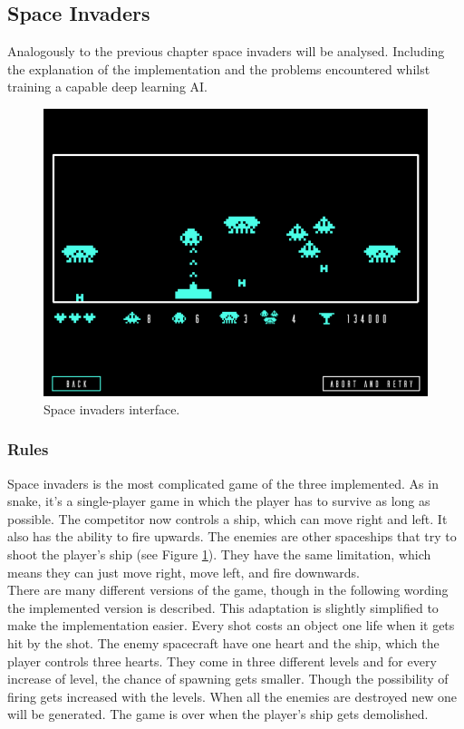 \documentclass[12pt]{article}
\begin{document}
\subsection{Space Invaders}
Analogously to the previous chapter space invaders will be analysed. Including the explanation of the implementation and the problems encountered whilst training a capable deep learning AI.
\begin{figure}[ht]
    \centering
    \includegraphics[width=0.9\linewidth]{pictures/SpaceInvaders.png}
    \caption{Space invaders interface.}
    \label{fig:spaceinvaders}
\end{figure}
\subsubsection{Rules}
Space invaders is the most complicated game of the three implemented. As in snake, it's a single-player game in which the player has to survive as long as possible. The competitor now controls a ship, which can move right and left. It also has the ability to fire upwards. The enemies are other spaceships that try to shoot the player's ship (see Figure \ref{fig:spaceinvaders}). They have the same limitation, which means they can just move right, move left, and fire downwards. \\
There are many different versions of the game, though in the following wording the implemented version is described. This adaptation is slightly simplified to make the implementation easier. Every shot costs an object one life when it gets hit by the shot. The enemy spacecraft have one heart and the ship, which the player controls three hearts. They come in three different levels and for every increase of level, the chance of spawning gets smaller. Though the possibility of firing gets increased with the levels. When all the enemies are destroyed new one will be generated. The game is over when the player's ship gets demolished.
\end{document}
